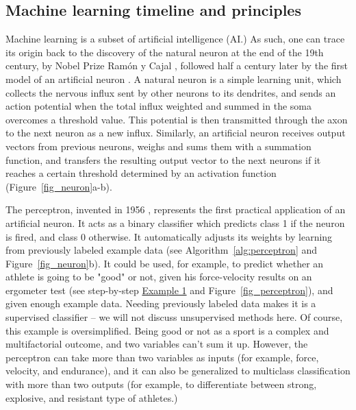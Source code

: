 \subsection{Machine learning timeline and principles}

Machine learning is a subset of artificial intelligence (AI.) As such, one can trace its origin back to the discovery of the natural neuron at the end of the 19th century, by Nobel Prize Ramón y Cajal \cite{Lopez2006}, followed half a century later by the first model of an artificial neuron \cite{Mcculloch1943}. A natural neuron is a simple learning unit, which collects the nervous influx sent by other neurons to its dendrites, and sends an action potential when the total influx weighted and summed in the soma overcomes a threshold value. This potential is then transmitted through the axon to the next neuron as a new influx. Similarly, an artificial neuron receives output vectors from previous neurons, weighs and sums them with a summation function, and transfers the resulting output vector to the next neurons if it reaches a certain threshold determined by an activation function (Figure~\ref{fig_neuron}a-b). 

The perceptron, invented in 1956 \cite{Rosenblatt1958}, represents the first practical application of an artificial neuron. It acts as a binary classifier which predicts class 1 if the neuron is fired, and class 0 otherwise. It automatically adjusts its weights by learning from previously labeled example data (see Algorithm~\ref{alg:perceptron} and Figure~\ref{fig_neuron}b). It could be used, for example, to predict whether an athlete is going to be "good" or not, given his force-velocity results on an ergometer test (see step-by-step \hyperlink{example1}{Example 1} and Figure~\ref{fig_perceptron}), and given enough example data. Needing previously labeled data makes it is a supervised classifier – we will not discuss unsupervised methods here. Of course, this example is oversimplified. Being good or not as a sport is a complex and multifactorial outcome, and two variables can't sum it up. However, the perceptron can take more than two variables as inputs (for example, force, velocity, and endurance), and it can also be generalized to multiclass classification with more than two outputs (for example, to differentiate between strong, explosive, and resistant type of athletes.)

